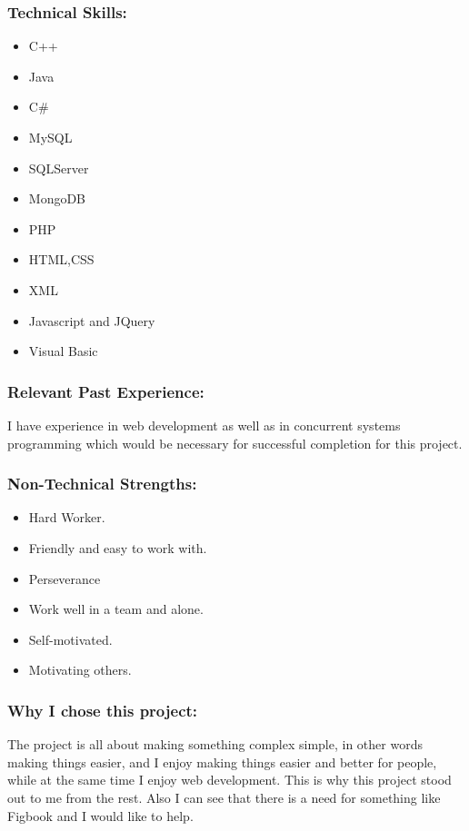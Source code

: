 \subsubsection{Technical Skills:}
	\begin{itemize}
		\item C++
		\item Java
		\item	C\#
		\item	MySQL
		\item	SQLServer
		\item	MongoDB
		\item PHP
		\item HTML,CSS
		\item XML
		\item Javascript and JQuery
		\item Visual Basic 
	\end{itemize}

\subsubsection{Relevant Past Experience:}
	\par{I have experience in web development as well as in concurrent systems programming which would be necessary for successful completion for this project.}

\subsubsection{Non-Technical Strengths:}
	\begin{itemize}
		\item Hard Worker.
		\item Friendly and easy to work with.
		\item Perseverance
		\item Work well in a team and alone.
		\item Self-motivated.
		\item Motivating others.
	\end{itemize}

\subsubsection{Why I chose this project:}
	\par{The project is all about making something complex simple, in other words making things easier, and I enjoy making things easier and better for people, while at the same time I enjoy web development. This is why this project stood out to me from the rest. Also I can see that there is a need for something like Figbook and I would like to help.}

